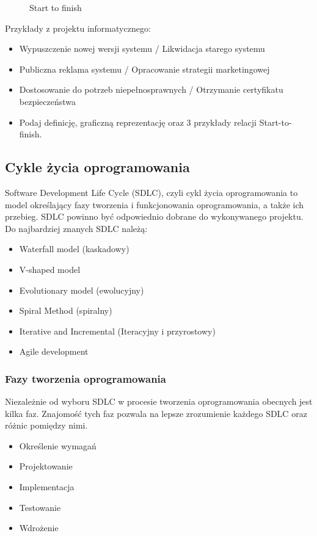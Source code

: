 \documentclass[a4paper,15pt]{article}
\begin{document}
\begin{figure}[H]
    \centering
    \qquad
    \caption{Start to finish}%
    \label{fig:example}%
\end{figure}


Przykłady z projektu informatycznego:
\begin{itemize}
\item Wypuszczenie nowej wersji systemu / Likwidacja starego systemu
\item Publiczna reklama systemu  / Opracowanie strategii marketingowej    
\item Dostosowanie do potrzeb niepełnosprawnych / Otrzymanie certyfikatu bezpieczeństwa 
\end{itemize}

\begin{framed}
\begin{itemize}
\item Podaj definicję, graficzną reprezentację oraz 3 przykłady relacji Start-to-finish.
\end{itemize}
\end{framed}






\newpage
\subsection{Cykle życia oprogramowania}

Software Development Life Cycle (SDLC), czyli cykl życia oprogramowania to model określający fazy tworzenia i funkcjonowania oprogramowania, a także ich przebieg. SDLC powinno być odpowiednio dobrane do wykonywanego projektu. \\
Do najbardziej znanych SDLC należą:
\begin{itemize}
\item Waterfall model (kaskadowy)
\item V-shaped model
\item Evolutionary model (ewolucyjny)
\item Spiral Method (spiralny)
\item Iterative and Incremental (Iteracyjny i przyrostowy)
\item Agile development
\end{itemize}

\subsubsection{Fazy tworzenia oprogramowania}
Niezależnie od wyboru SDLC w procesie tworzenia oprogramowania obecnych jest kilka faz. Znajomość tych faz pozwala na lepsze zrozumienie każdego SDLC oraz różnic pomiędzy nimi.
\begin{itemize}
\item Określenie wymagań
\item Projektowanie
\item Implementacja
\item Testowanie
\item Wdrożenie
\end{itemize}
\end{document}

